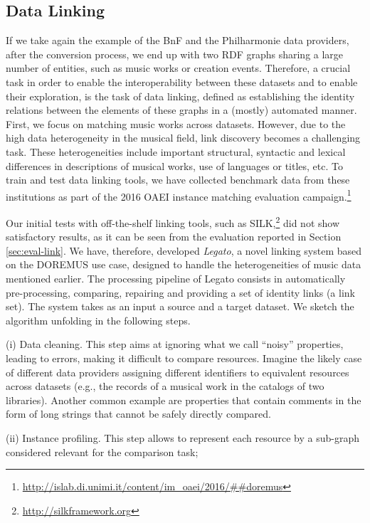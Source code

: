 \subsection{Data Linking} \label{subsec:datalinking}
If we take again the example of the BnF and the Philharmonie data providers, after the conversion process, we end up with two RDF graphs sharing a large number of entities, such as music works or creation events. Therefore, a crucial task in order to enable the interoperability between these datasets and to enable their exploration, is the task of data linking, defined as establishing the identity relations between the elements of these graphs in a (mostly) automated manner. First, we focus on matching music works across datasets. However, due to the high data heterogeneity in the musical field, link discovery becomes a challenging task. These heterogeneities include important structural, syntactic and lexical differences in descriptions of musical works, use of languages or titles, etc. To train and test data linking tools, we have collected benchmark data from these institutions as part of the 2016 OAEI instance matching evaluation campaign.\footnote{\url{http://islab.di.unimi.it/content/im_oaei/2016/##doremus}}

Our initial tests with off-the-shelf linking tools, such as SILK,\footnote{\url{http://silkframework.org}} did not show satisfactory results, as it can be seen from the evaluation reported in Section \ref{sec:eval-link}. We have, therefore, developed \textit{Legato}, a novel linking system based on the DOREMUS use case, designed to handle the heterogeneities of music data mentioned earlier. The processing pipeline of Legato consists in automatically pre-processing, comparing, repairing and providing a set of identity links (a link set). The system takes as an input a source and a target dataset. We sketch the algorithm unfolding in the following steps.
 
(i) Data cleaning. This step aims at ignoring what we call ``noisy'' properties, leading to errors, making it difficult to compare resources. Imagine the likely case of different data providers assigning different identifiers to equivalent resources across datasets (e.g., the records of a musical work in the catalogs of two libraries). Another common example are properties that contain comments in the form of long strings that cannot be safely directly compared. 

(ii) Instance profiling. This step allows to represent each resource by a sub-graph considered relevant for the comparison task;

